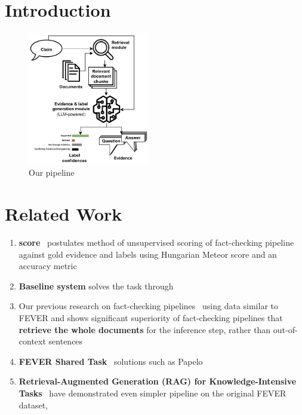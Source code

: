 
\section{Introduction}
\label{sec:introduction}

\begin{figure}[h]
    \centering
    \includegraphics[width=0.47\textwidth]{figures/pipeline.pdf}
    \caption{Our pipeline}
    \label{fig:pipeline}
\end{figure}

\section{Related Work}
\label{sec:relwork}
\begin{enumerate}
    \item \textbf{\averitec{} score}~\cite{averitec2024} postulates method of unsupervised scoring of fact-checking pipeline against gold evidence and labels using Hungarian Meteor score and an accuracy metric
    \item \textbf{Baseline \averitec{} system} solves the task through 
    \item Our previous research on fact-checking pipelines~\cite{Ullrich2023,drchal2023pipelinedatasetgenerationautomated} using data similar to FEVER and \averitec{} shows significant superiority of fact-checking pipelines that \textbf{retrieve the whole documents} for the inference step, rather than out-of-context sentences
    \item \textbf{FEVER Shared Task}~\cite{thorne-etal-2018-fact} solutions such as Papelo~\cite{}
    \item \textbf{Retrieval-Augmented Generation (RAG) for Knowledge-Intensive Tasks}~\cite{rag} have demonstrated even simpler pipeline on the original FEVER dataset, 
\end{enumerate}

